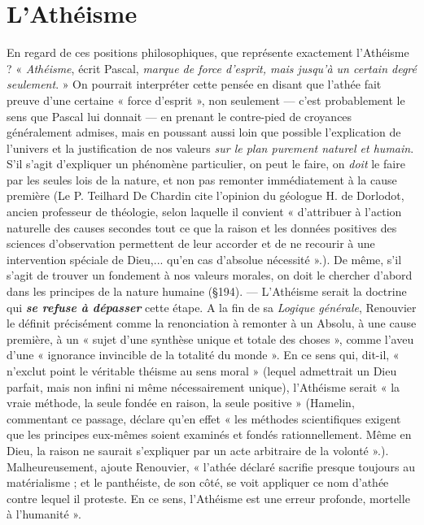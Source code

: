 \section{L’Athéisme}%
En regard de ces positions philosophiques,
que représente exactement l’Athéisme ? « {\it Athéisme}, écrit Pascal,
{\it marque de force d'esprit, mais jusqu’à un certain degré seulement}. »
On pourrait interpréter cette pensée en disant que l’athée fait preuve
d’une certaine « force d’esprit », non seulement — c’est probablement
le sens que Pascal lui donnait — en prenant le contre-pied de croyances
généralement admises, mais en poussant aussi loin que possible
l'explication de l’univers et la justification de nos valeurs {\it sur le plan
purement naturel et humain}. S'il s’agit d'expliquer un phénomène particulier,
on peut le faire, on {\it doit} le faire par les seules lois de la nature,
et non pas remonter immédiatement à la cause première
{\footnotesize (Le P. Teilhard De Chardin cite l'opinion du géologue H. de Dorlodot, ancien
professeur de théologie, selon laquelle il convient « d'attribuer à l’action naturelle des
causes secondes tout ce que la raison et les données positives des sciences d'observation
permettent de leur accorder et de ne recourir à une intervention spéciale de Dieu,... qu'en
cas d’absolue nécessité ».)}.
De même,
s’il s’agit de trouver un fondement à nos valeurs morales, on doit le
chercher d’abord dans les principes de la nature humaine (\S 194).
— L’Athéisme serait la doctrine qui \textbf{\textit {se refuse à dépasser}} cette
étape. A la fin de sa {\it Logique générale}, Renouvier le définit précisément
comme la renonciation à remonter à un Absolu, à une cause première,
à un « sujet d’une synthèse unique et totale des choses », comme
l’aveu d’une « ignorance invincible de la totalité du monde ». En ce
sens qui, dit-il, « n’exclut point le véritable théisme au sens moral »
(lequel admettrait un Dieu parfait, mais non infini ni même nécessairement
unique), l’Athéisme serait « la vraie méthode, la seule fondée
en raison, la seule positive »
{\footnotesize (Hamelin, commentant ce passage, déclare qu’en effet « les méthodes scientifiques
exigent que les principes eux-mêmes soient examinés et fondés rationnellement. Même
en Dieu, la raison ne saurait s'expliquer par un acte arbitraire de la volonté ».)}.
Malheureusement, ajoute Renouvier,
« l’athée déclaré sacrifie presque toujours au matérialisme ; et le
panthéiste, de son côté, se voit appliquer ce nom d’athée contre
lequel il proteste. En ce sens, l’Athéisme est une erreur profonde,
mortelle à l’humanité ».

